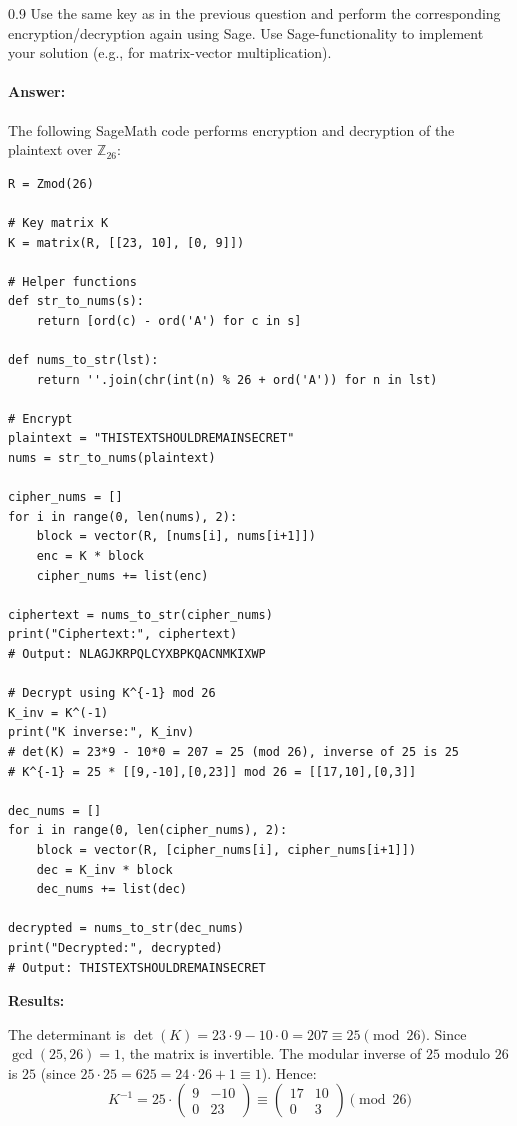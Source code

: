 \documentclass[]{scrartcl}
\newcounter{exercise}
\newcounter{qid}[section]
\newcommand{\exerciseprefix}{prefix}
\newcommand{\questiontitle}{Questions}
\newcommand{\blockid}{B3}
\newcommand{\exname}{}
\begin{document}
\renewcommand{\exerciseprefix}{PS-\blockid{}-E\theexercise: \exname-Q\theqid}
\renewcommand{\questiontitle}{\exerciseprefix{}: Encryption/Decryption in Sage}
\begin{exercisebox}{0.9}
Use the same key as in the previous question and perform the corresponding encryption/decryption again using Sage. Use Sage-functionality to implement your solution (e.g., for matrix-vector multiplication). 
\end{exercisebox}

\paragraph{Answer:}

The following SageMath code performs encryption and decryption of the plaintext over $\mathbb{Z}_{26}$:

\begin{lstlisting}[style=sageStyle, caption={Hill cipher encryption and decryption in SageMath}]
R = Zmod(26)

# Key matrix K
K = matrix(R, [[23, 10], [0, 9]])

# Helper functions
def str_to_nums(s):
    return [ord(c) - ord('A') for c in s]

def nums_to_str(lst):
    return ''.join(chr(int(n) % 26 + ord('A')) for n in lst)

# Encrypt
plaintext = "THISTEXTSHOULDREMAINSECRET"
nums = str_to_nums(plaintext)

cipher_nums = []
for i in range(0, len(nums), 2):
    block = vector(R, [nums[i], nums[i+1]])
    enc = K * block
    cipher_nums += list(enc)

ciphertext = nums_to_str(cipher_nums)
print("Ciphertext:", ciphertext)
# Output: NLAGJKRPQLCYXBPKQACNMKIXWP

# Decrypt using K^{-1} mod 26
K_inv = K^(-1)
print("K inverse:", K_inv)
# det(K) = 23*9 - 10*0 = 207 = 25 (mod 26), inverse of 25 is 25
# K^{-1} = 25 * [[9,-10],[0,23]] mod 26 = [[17,10],[0,3]]

dec_nums = []
for i in range(0, len(cipher_nums), 2):
    block = vector(R, [cipher_nums[i], cipher_nums[i+1]])
    dec = K_inv * block
    dec_nums += list(dec)

decrypted = nums_to_str(dec_nums)
print("Decrypted:", decrypted)
# Output: THISTEXTSHOULDREMAINSECRET
\end{lstlisting}

\textbf{Results:}

The determinant is $\det(K) = 23 \cdot 9 - 10 \cdot 0 = 207 \equiv 25 \pmod{26}$. Since $\gcd(25,26)=1$, the matrix is invertible. The modular inverse of $25$ modulo $26$ is $25$ (since $25 \cdot 25 = 625 = 24\cdot 26 + 1 \equiv 1$). Hence:
\[
K^{-1} = 25 \cdot \begin{pmatrix}9 & -10 \\ 0 & 23\end{pmatrix} \equiv \begin{pmatrix}17 & 10 \\ 0 & 3\end{pmatrix} \pmod{26}
\]
\end{document}

